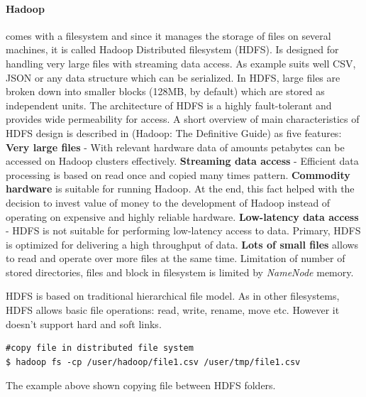 \documentclass[a4paper,12pt,oneside]{report}
\begin{document}
	\paragraph*{Hadoop} comes with a filesystem and since it manages the storage of
	files on several 
	machines, it is called Hadoop Distributed filesystem (HDFS). Is designed for
	handling very large files with streaming
	data access. As example suits well CSV, JSON or any data structure which can be
	serialized. \cite{hadoop_hdfs_web} In HDFS, large files are broken down into
	smaller blocks (128MB, by default) which are 
	stored as independent units. The architecture of HDFS is a highly fault-tolerant
	and provides wide permeability
	for access.   
	A short overview of main characteristics of HDFS design is described in
	(Hadoop: The Definitive 
	Guide\cite{hadoop_definitive}) as five features: \textbf{Very large files} -
	With relevant hardware data of amounts petabytes 
	can be accessed on Hadoop clusters effectively. \textbf{Streaming data access} -
	Efficient data processing is based on
	read once and copied many times pattern. \textbf{Commodity hardware} is
	suitable for running Hadoop. At the end,
	this fact helped with the decision to invest value of money to the development
	of Hadoop instead 
	of operating on expensive and highly reliable hardware. \textbf{Low-latency
		data access} - HDFS is not suitable for performing
	low-latency access to data. Primary, HDFS is optimized for delivering
	a high throughput of data. \textbf{Lots of small files} allows to read and
	operate over more files
	at the same time. Limitation of number of stored directories,  files and block
	in filesystem is limited by \emph{NameNode} memory.
	
	HDFS is based on traditional hierarchical file model. As in other filesystems,
	HDFS allows basic file operations: 
	read, write, rename, move etc. However it doesn’t support hard and soft links. 
	
	\begin{footnotesize}
		\begin{lstlisting}[style=mybash]
#copy file in distributed file system
$ hadoop fs -cp /user/hadoop/file1.csv /user/tmp/file1.csv 
		\end{lstlisting}
	\end{footnotesize} 
	The example above shown copying file between HDFS folders. 
	
	
\end{document}
